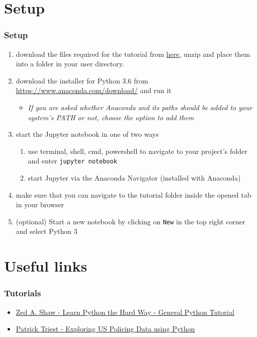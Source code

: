 \section{Setup} %
\label{sec:setup}

\begin{frame}[c]\frametitle{Setup}
\begin{enumerate}
    \item download the files required for the tutorial from \href{https://www.dropbox.com/sh/0onu61t2olg2gwz/AAAtqiANuKODdBDdPlGTYtXja?dl=0}{here}, unzip and place them into a folder in your user directory.
    \item download the installer for Python 3.6 from \url{https://www.anaconda.com/download/} and run it
    \begin{itemize}
        \item \textit{If you are asked whether Anaconda and its paths should be added to your system's PATH or not, choose the option to add them}
    \end{itemize}
    \item start the Jupyter notebook in one of two ways
    \begin{enumerate}
        \item use terminal, shell, cmd, powershell to navigate to your project's folder and enter \texttt{jupyter notebook}
        \item start Jupyter via the Anaconda Navigator (installed with Anaconda)
    \end{enumerate}
    \item make sure that you can navigate to the tutorial folder inside the opened tab in your browser
    \item (optional) Start a new notebook by clicking on \texttt{New} in the top right corner and select Python 3
\end{enumerate}
\end{frame}

\section{Useful links} %
\label{sec:useful_links}

\begin{frame}[c]\frametitle{Tutorials}
\begin{itemize}
    \item \href{https://learnpythonthehardway.org/}{Zed A. Shaw - Learn Python the Hard Way - General Python Tutorial}
    \item \href{https://blog.patricktriest.com/police-data-python/}{Patrick Triest - Exploring US Policing Data using Python}
\end{itemize}
\end{frame}

